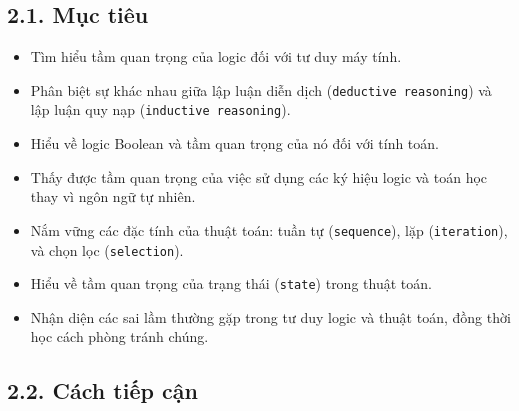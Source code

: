 \subsection*{2.1. Mục tiêu}
\begin{itemize}
    \item Tìm hiểu tầm quan trọng của logic đối với tư duy máy tính.
    \item Phân biệt sự khác nhau giữa lập luận diễn dịch (\texttt{deductive reasoning}) và lập luận quy nạp (\texttt{inductive reasoning}).
    \item Hiểu về logic Boolean và tầm quan trọng của nó đối với tính toán.
    \item Thấy được tầm quan trọng của việc sử dụng các ký hiệu logic và toán học thay vì ngôn ngữ tự nhiên.
    \item Nắm vững các đặc tính của thuật toán: tuần tự (\texttt{sequence}), lặp (\texttt{iteration}), và chọn lọc (\texttt{selection}).
    \item Hiểu về tầm quan trọng của trạng thái (\texttt{state}) trong thuật toán.
    \item Nhận diện các sai lầm thường gặp trong tư duy logic và thuật toán, đồng thời học cách phòng tránh chúng.
\end{itemize}

\subsection*{2.2. Cách tiếp cận}

